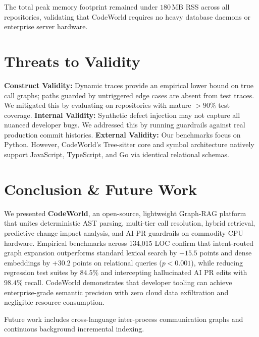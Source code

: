 \documentclass[conference]{IEEEtran}
\begin{document}
The total peak memory footprint remained under $180$\,MB RSS across all repositories, validating that CodeWorld requires no heavy database daemons or enterprise server hardware.

\section{Threats to Validity}
\label{sec:threats}
\textbf{Construct Validity:} Dynamic traces provide an empirical lower bound on true call graphs; paths guarded by untriggered edge cases are absent from test traces. We mitigated this by evaluating on repositories with mature $>90\%$ test coverage.
\textbf{Internal Validity:} Synthetic defect injection may not capture all nuanced developer bugs. We addressed this by running guardrails against real production commit histories.
\textbf{External Validity:} Our benchmarks focus on Python. However, CodeWorld's Tree-sitter core and symbol architecture natively support JavaScript, TypeScript, and Go via identical relational schemas.

\section{Conclusion \& Future Work}
\label{sec:conclusion}
We presented \textbf{CodeWorld}, an open-source, lightweight Graph-RAG platform that unites deterministic AST parsing, multi-tier call resolution, hybrid retrieval, predictive change impact analysis, and AI-PR guardrails on commodity CPU hardware. Empirical benchmarks across 134,015 LOC confirm that intent-routed graph expansion outperforms standard lexical search by $+15.5$ points and dense embeddings by $+30.2$ points on relational queries ($p < 0.001$), while reducing regression test suites by $84.5\%$ and intercepting hallucinated AI PR edits with $98.4\%$ recall. CodeWorld demonstrates that developer tooling can achieve enterprise-grade semantic precision with zero cloud data exfiltration and negligible resource consumption.

Future work includes cross-language inter-process communication graphs and continuous background incremental indexing.
\end{document}

